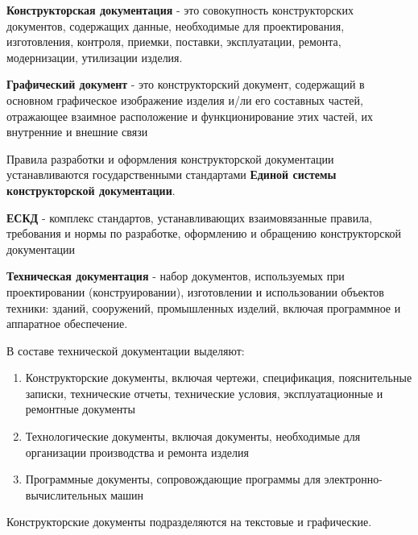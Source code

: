 \documentclass{article}
\begin{document}
\begin{flushleft}
\textbf{Конструкторская документация} - это совокупность конструкторских документов, содержащих данные, необходимые для проектирования, изготовления, контроля, приемки, поставки, эксплуатации, ремонта, модернизации, утилизации изделия.

\hfill

\textbf{Графический документ} - это конструкторский документ, содержащий в основном графическое изображение изделия и/ли его составных частей, отражающее взаимное расположение и функционирование этих частей, их внутренние и внешние связи

\hfill

Правила разработки и оформления конструкторской документации устанавливаются государственными стандартами \textbf{Единой системы конструкторской документации}.

\textbf{ЕСКД} - комплекс стандартов, устанавливающих взаимовязанные правила, требования и нормы по разработке, оформлению и обращению конструкторской документации

\hfill

\textbf{Техническая документация} - набор документов, используемых при проектировании (конструировании), изготовлении и использовании объектов техники: зданий, сооружений, промышленных изделий, включая программное и аппаратное обеспечение.

В составе технической документации выделяют:

\begin{enumerate}
    \item Конструкторские документы, включая чертежи, спецификация, пояснительные записки, технические отчеты, технические условия, эксплуатационные и ремонтные документы
    \item Технологические документы, включая документы, необходимые для организации производства и ремонта изделия
    \item Программные документы, сопровождающие программы для электронно-вычислительных машин
\end{enumerate}

Конструкторские документы подразделяются на текстовые и графические.

\end{flushleft}
\end{document}
